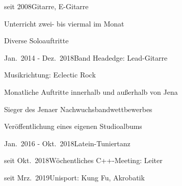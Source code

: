 \documentclass[a4paper,10pt]{cv}
\begin{document}
    \vspace{-1em}
    \begin{multicols}{2}
      \begin{cvTimeItem}{seit 2008}{Gitarre, E-Gitarre}
        \begin{cvItemize}
          \item Unterricht zwei- bis viermal im Monat
          \item Diverse Soloauftritte
        \end{cvItemize}
      \end{cvTimeItem}
      \begin{cvTimeItem}{Jan.~2014 - Dez.~2018}{Band Headedge: Lead-Gitarre}
        \begin{cvItemize}
          \item Musikrichtung: Eclectic Rock
          \item Monatliche Auftritte innerhalb und außerhalb von Jena
          \item Sieger des Jenaer Nachwuchsbandwettbewerbes
          \item Veröffentlichung eines eigenen Studioalbums
        \end{cvItemize}
      \end{cvTimeItem}
      \begin{cvTimeItem}{Jan.~2016 - Okt.~2018}{Latein-Tuniertanz}
      \end{cvTimeItem}
      \begin{cvTimeItem}{seit Okt.~2018}{Wöchentliches C++-Meeting: Leiter}
      \end{cvTimeItem}
      \begin{cvTimeItem}{seit Mrz.~2019}{Unisport: Kung Fu, Akrobatik}
      \end{cvTimeItem}
    \end{multicols}
\end{document}

